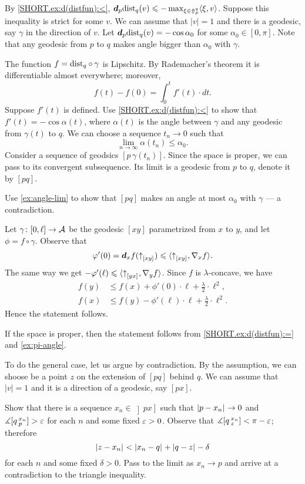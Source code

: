 By \ref{SHORT.ex:d(distfun):<}, $\bm{d}_p\mathrm{dist}_q(v)\leqslant-\max_{\xi\in\Uparrow_p^q}\langle\xi,v\rangle$.
Suppose this inequality is strict for some $v$.
We can assume that $|v|=1$ and there is a geodesic, say $\gamma$ in the direction of $v$.
Let $\bm{d}_p\mathrm{dist}_q(v)=-\cos\alpha_0$ for some $\alpha_0\in [0,\pi]$.
Note that any geodesic from $p$ to $q$ makes angle bigger than $\alpha_0$ with $\gamma$.

The function $f=\mathrm{dist}_q\circ\gamma$ is Lipschitz.
By Rademacher's theorem it is differentiable almost everywhere;
moreover, 
\[f(t)-f(0)=\int_0^t f'(t)\cdot dt.\]
Suppose $f'(t)$ is defined.
Use \ref{SHORT.ex:d(distfun):<} to show that 
$f'(t)=-\cos\alpha(t)$, where $\alpha(t)$ is the angle between $\gamma$ and any geodesic from $\gamma(t)$ to $q$.
We can choose a sequence $t_n\to 0$ such that 
\[\lim_{n\to\infty}\alpha(t_n) \le \alpha_0.\]
Consider a sequence of geodsics $[p\,\gamma(t_n)]$.
Since the space is proper, we can pass to its convergent subsequence.
Its limit is a geodesic from $p$ to $q$, denote it by $[pq]$.

Use \ref{ex:angle-lim} to show that $[pq]$ makes an angle at most $\alpha_0$ with $\gamma$ --- a contradiction.
 
Let $\gamma\colon[0,\ell]\to \mathcal{A}$ be the geodesic $[xy]$ parametrized from $x$ to $y$,
and let $\phi=f\circ\gamma$.
Observe that 
\[\varphi'(0)=\bm{d}_xf({\uparrow}_{[{x}{y}]_{{}}})\leqslant \langle{\uparrow}_{[{x}{y}]_{{}}},\nabla_{x}f\rangle.\]
The same way we get $-\varphi'(\ell)\leqslant \langle{\uparrow}_{[{y}{x}]_{{}}},\nabla_{y}f\rangle$.
Since $f$ is $\lambda$-concave, we have
\begin{align*}
f(y)&\le f(x)+\phi'(0)\cdot \ell+\tfrac\lambda2\cdot\ell^2,
\\
f(x)&\le f(y)-\phi'(\ell)\cdot \ell+\tfrac\lambda2\cdot\ell^2.
\end{align*}
Hence the statement follows.

If the space is proper, then the statement follows from \ref{SHORT.ex:d(distfun):=} and \ref{ex:pi-angle}.

To do the general case, let us argue by contradiction.
By the assumption, we can shoose be a point $z$ on the extension of $[pq]$ behind $q$.
We can assume that $|v|=1$ and it is a direction of a geodesic, say $[px]$.

Show that there is a sequence $x_n\in \left]px\right]$ such that $|{p}-{x_n}|_{}^{{}}\to0$ and
$\measuredangle [q\,{}^{x_n}_{p}]>\varepsilon$ for each $n$ and some fixed $\varepsilon>0$.
Observe that $\measuredangle[q\,{}^{x_n}_{z}]<\pi-\varepsilon$; therefore
\[\dist{z}{x_n}{}<\dist{x_n}{q}{}+\dist{q}z{}-\delta\]
for each $n$ and some fixed $\delta>0$.
Pass to the limit as $x_n\to p$ and arrive at a contradiction to the triangle inequality.

